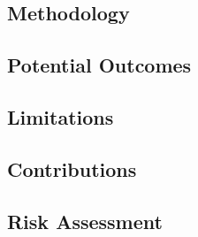 \subsection{Methodology}




\subsection{Potential Outcomes}


\subsection{Limitations}

\paragraph{}



\subsection{Contributions}

\subsection{Risk Assessment}